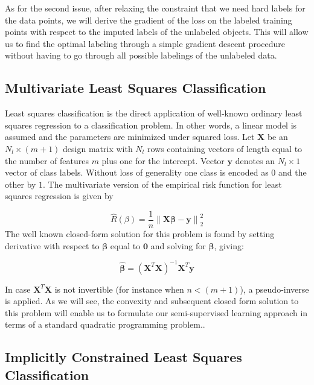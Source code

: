 \documentclass[smallcondensed]{svjour3}
\begin{document}
As for the second issue, after relaxing the constraint that we need hard labels for the data points, we will derive the gradient of the loss on the labeled training points with respect to the imputed labels of the unlabeled objects. This will allow us to find the optimal labeling through a simple gradient descent procedure without having to go through all possible labelings of the unlabeled data. 

\subsection{Multivariate Least Squares Classification}

Least squares classification \cite{Hastie2001,Rifkin2003} is the direct application of well-known ordinary least squares regression to a classification problem. In other words, a linear model is assumed and the parameters are minimized under squared loss. Let $\mathbf{X}$ be an $N_l \times (m+1)$ design matrix with $N_l$ rows containing vectors of length equal to the number of features $m$ plus one for the intercept. Vector $\textbf{y}$ denotes an $N_l \times 1$ vector of  class labels. Without loss of generality one class is encoded as $0$ and the other by $1$.  The multivariate version of the empirical risk function for least squares regression is given by

\begin{equation} \label{squaredloss}
\hat{R}(\beta) = \frac{1}{n} \left\|  \mathbf{X} \boldsymbol{\beta}-\mathbf{y} \right\| _2^2
\end{equation}
The well known closed-form solution for this problem is found by setting derivative with respect to $\boldsymbol{\beta}$ equal to $\textbf{0}$ and solving for $\boldsymbol{\beta}$, giving:

\begin{equation} \label{olssolution}
\boldsymbol{\hat{\beta}}=\left(\mathbf{X}^T \mathbf{X}\right)^{-1} \mathbf{X}^T \mathbf{y}
\end{equation}

In case $\textbf{X}^T \textbf{X}$ is not invertible (for instance when $n<(m+1)$), a pseudo-inverse is applied. As we will see, the convexity and subsequent closed form solution to this problem will enable us to formulate our semi-supervised learning approach in terms of a standard quadratic programming problem..

\subsection{Implicitly Constrained Least Squares Classification} \label{section:icls}
\end{document}
